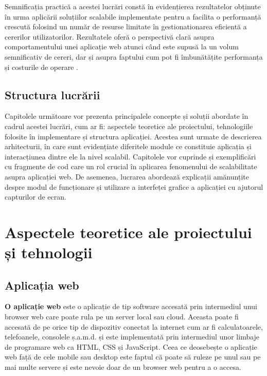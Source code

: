 \documentclass[12pt, a4paper, oneside, romanian]{teza-upb}
\begin{document}
	Semnificația practică a acestei lucrări constă în evidențierea rezultatelor obținute în urma aplicării soluțiilor scalabile implementate pentru a facilita o performanță crescută folosind un număr de resurse limitate în gestionationarea eficientă a cererilor utilizatorilor. Rezultatele oferă o perspectivă clară asupra comportamentului unei aplicație web atunci când este supusă la un volum semnificativ de cereri, dar și asupra faptului cum pot fi îmbunătățite performanța și costurile de operare .
	
	\section{Structura lucrării}
	Capitolele următoare vor prezenta principalele concepte și soluții abordate în cadrul acestei lucrări, cum ar fi: aspectele teoretice ale proiectului, tehnologiile folosite în implementare și structura aplicației. Acestea sunt urmate de descrierea arhitecturii, în care sunt evidențiate diferitele module ce constituie aplicația și interacțiunea dintre ele la nivel scalabil. Capitolele vor cuprinde și exemplificări cu fragmente de cod care un rol crucial în aplicarea fenomenului de scalabilitate asupra aplicației web. De asemenea, lucrarea abordează explicații amănunțite despre modul de funcționare și utilizare a interfeței grafice a aplicației cu ajutorul capturilor de ecran.
	
	\chapter{Aspectele teoretice ale proiectului și tehnologii}
	
	\section {Aplicația web}
	
	\textbf{O aplicație web} \cite{web} este o aplicație de tip software accesată prin intermediul unui browser web care poate rula pe un server local sau cloud. Aceasta poate fi accesată de pe orice tip de dispozitiv conectat la internet cum ar fi calculatoarele, telefoanele, consolele ș.a.m.d. și este implementată prin intermediul unor limbaje de programare web ca HTML, CSS și JavaScript. Ceea ce deosebește o aplicație web față de cele mobile sau desktop este faptul că poate să ruleze pe unul sau pe mai multe servere și este nevoie doar de un browser web pentru a o accesa. 
	
\end{document}
